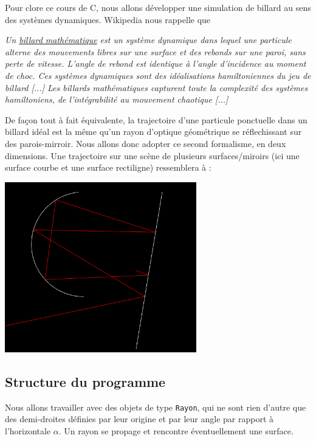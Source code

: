 \documentclass{book}
\newcommand{\inline}[1]{\texttt{#1}}
\newcommand{\cpp}{\mbox{C\vspace{.5em}\protect\raisebox{.2ex}{\footnotesize++~}}}
\begin{document}
Pour clore ce cours de \cpp, nous allons développer une simulation de billard au sens des systèmes dynamiques. Wikipedia nous rappelle que

\begin{displayquote}
\textit{Un \href{https://fr.wikipedia.org/wiki/Billard_(mathématiques)}{billard mathématique} est un système dynamique dans lequel une particule alterne des mouvements libres sur une surface et des rebonds sur une paroi, sans perte de vitesse. L'angle de rebond est identique à l'angle d'incidence au moment de choc. Ces systèmes dynamiques sont des idéalisations hamiltoniennes du jeu de billard [...] Les billards mathématiques capturent toute la complexité des systèmes hamiltoniens, de l'intégrabilité au mouvement chaotique [...]}
\end{displayquote}

De façon tout à fait équivalente, la trajectoire d'une particule ponctuelle dans un billard idéal est la même qu'un rayon d'optique géométrique se réflechissant sur des parois-mirroir. Nous allons donc adopter ce second formalisme, en deux dimensions. Une trajectoire sur une scène de plusieurs surfaces/miroirs (ici une surface courbe et une surface rectiligne) ressemblera à :

\begin{center}
  \includegraphics[height=20em]{TD5/reflections-exemples.png}
\end{center}

\subsection{Structure du programme}

Nous allons travailler avec des objets de type \inline{Rayon}, qui ne sont rien d'autre que des demi-droites définies par leur origine et par leur angle par rapport à l'horizontale $\alpha$. Un rayon se propage et rencontre éventuellement une surface.
\end{document}
